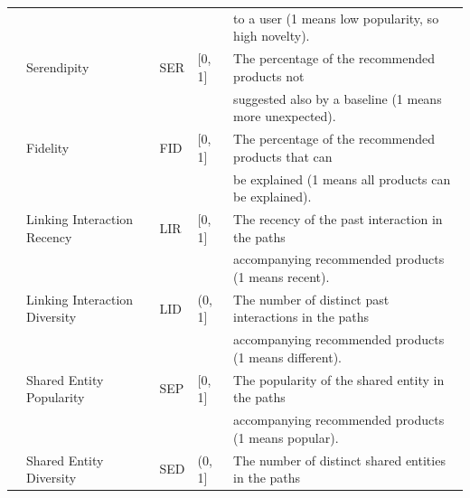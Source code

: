 \documentclass[runningheads]{llncs}
\begin{document}
\begin{table}[!t]
{\begin{tabular}{lllll}
                                              &   &             &  & to a user (1 means low popularity, so high novelty).  \\
                                     & Serendipity                   & SER             & {[}0, 1{]}     & The percentage of the recommended products not                      \\
                                              &   &             &  &  suggested also by a baseline (1 means more unexpected). \\
\hline
{} & Fidelity                      & FID             & {[}0, 1{]}     & The percentage of the recommended products that can                                  \\
 &   &             &  &  be explained (1 means all products can be explained).     \\
                                     & Linking Interaction Recency   & LIR             & {[}0, 1{]}     & The recency of the past interaction in the paths \\
                                                 &   &             &  & accompanying recommended products (1 means recent).     \\
                                     & Linking Interaction Diversity & LID             & (0, 1{]} & The number of distinct past interactions in the paths                                                                                                                                          \\
                                     &   &             &  & accompanying recommended products (1 means different).   \\
                                     & Shared Entity Popularity      & SEP             &   {[}0, 1{]}             &   The popularity of the shared entity in the paths                                                                                                                                        \\
                                      &   &             &  & accompanying recommended products (1 means popular).      \\
                                     & Shared Entity Diversity       & SED             &     (0, 1{]}           &  The number of distinct shared entities in the paths                 \\

\end{tabular}}
\end{table}
\end{document}
